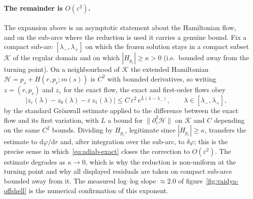 \documentclass[12pt]{iopart}
\newcommand{\dd}{\mathrm{d}}
\theoremstyle{plain}
\theoremstyle{definition}
\theoremstyle{plain}
\theoremstyle{remark}
\begin{document}
\paragraph{The remainder is $O(\varepsilon^2)$.} The expansion above is an asymptotic
statement about the Hamiltonian flow, and on the sub-arcs where the reduction is used it
carries a genuine bound. Fix a compact sub-arc $[\lambda_-,\lambda_+]$ on which the frozen
solution stays in a compact subset $\mathcal K$ of the regular domain and on which
$|H_{p_r}|\ge\kappa>0$ (i.e.\ bounded away from the turning point). On a neighbourhood of
$\mathcal K$ the extended Hamiltonian $\mathcal H=p_s+H(r,p_r;m(s))$ is $C^2$ with bounded
derivatives, so writing $z=(r,p_r)$ and $z_\varepsilon$ for the exact flow, the exact and
first-order flows obey
\[
   \big|z_\varepsilon(\lambda)-z_0(\lambda)-\varepsilon\,z_1(\lambda)\big|
   \le C\,\varepsilon^{2}\,e^{L(\lambda-\lambda_-)} ,
   \qquad \lambda\in[\lambda_-,\lambda_+],
\]
by the standard Gr\"onwall estimate applied to the difference between the exact flow and
its first variation, with $L$ a bound for $\|\partial_z^2\mathcal H\|$ on $\mathcal K$ and
$C$ depending on the same $C^2$ bounds. Dividing by $H_{p_r}$, legitimate since
$|H_{p_r}|\ge\kappa$, transfers the estimate to $\dd\varphi/\dd r$ and, after integration
over the sub-arc, to $\delta\varphi$; this is the precise sense in
which~\eqref{eq:adiab-exact} closes the correction to $O(\varepsilon^2)$. The estimate
degrades as $\kappa\to0$, which is why the reduction is non-uniform at the turning point
and why all displayed residuals are taken on compact sub-arcs bounded away from it. The
measured log--log slope $\approx2.0$ of figure~\ref{fig:vaidya-offshell} is the numerical
confirmation of this exponent.
\end{document}
